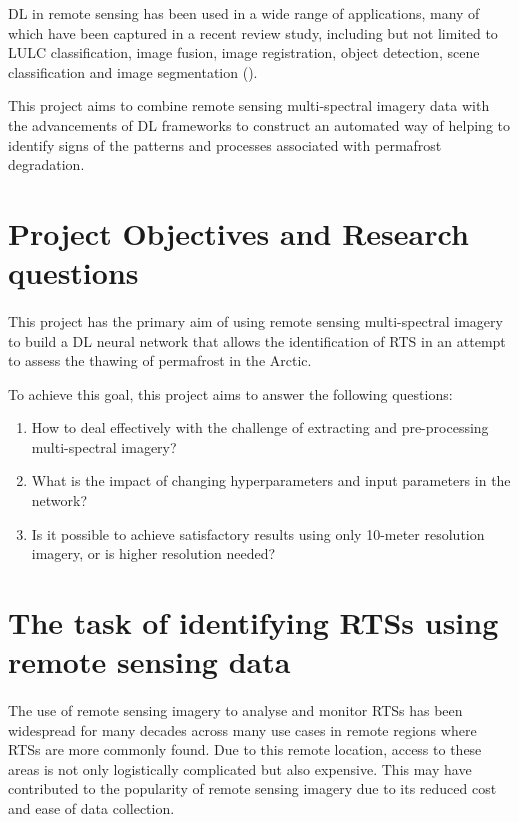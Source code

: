 \gls{DL} in remote sensing has been used in a wide range of applications, many of which have been captured in a recent review study, including but not limited to \gls{LULC} classification, image fusion, image registration, object detection, scene classification and image segmentation (\cite{MA2019166}).

This project aims to combine remote sensing multi-spectral imagery data with the advancements of \gls{DL} frameworks to construct an automated way of helping to identify signs of the patterns and processes associated with permafrost degradation.

\section{Project Objectives and Research questions} \label{projectqs}
\paragraph{}
This project has the primary aim of using remote sensing multi-spectral imagery to build a \gls{DL} neural network that allows the identification of \gls{RTS} in an attempt to assess the thawing of permafrost in the Arctic.

To achieve this goal, this project aims to answer the following questions:

\begin{enumerate}
    \item How to deal effectively with the challenge of extracting and pre-processing multi-spectral imagery?
    \item What is the impact of changing hyperparameters and input parameters in the network?
    \item Is it possible to achieve satisfactory results using only 10-meter resolution imagery, or is higher resolution needed?
\end{enumerate}

\section{The task of identifying \gls{RTS}s using remote sensing data} \label{rts_task}
\paragraph{}
The use of remote sensing imagery to analyse and monitor \gls{RTS}s has been widespread for many decades across many use cases in remote regions where \gls{RTS}s are more commonly found. Due to this remote location, access to these areas is not only logistically complicated but also expensive. This may have contributed to the popularity of remote sensing imagery due to its reduced cost and ease of data collection.

